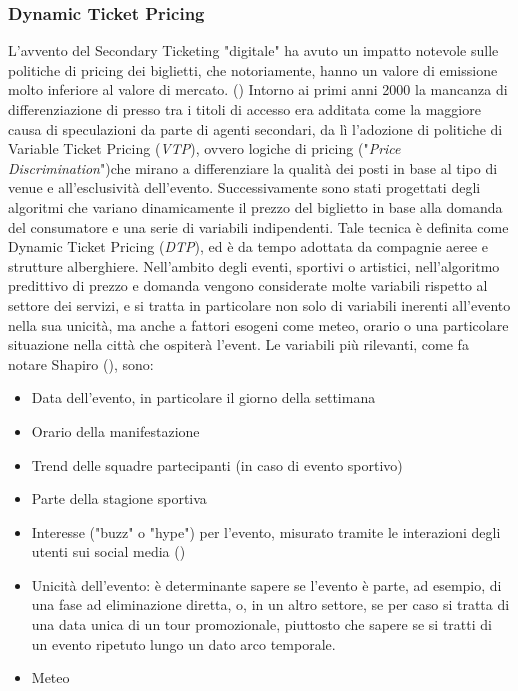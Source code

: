 \subsubsection{Dynamic Ticket Pricing} \label{dtp}
L'avvento del Secondary Ticketing "digitale" ha avuto un impatto notevole sulle politiche di pricing dei biglietti, che notoriamente, hanno un valore di emissione molto inferiore al valore di mercato. (\cite{courty2014pricing})
Intorno ai primi anni 2000 la mancanza di differenziazione di presso tra i titoli di accesso era additata come la maggiore causa di speculazioni da parte di agenti secondari, da lì l'adozione di politiche di Variable Ticket Pricing (\textit{VTP}), ovvero logiche di pricing ("\textit{Price Discrimination}")che mirano a differenziare la qualità dei posti in base al tipo di venue e all'esclusività dell'evento. 
Successivamente sono stati progettati degli algoritmi che variano dinamicamente il prezzo del biglietto in base alla domanda del consumatore e una serie di variabili indipendenti. Tale tecnica è definita come Dynamic Ticket Pricing (\textit{DTP}), ed è da tempo adottata da compagnie aeree e strutture alberghiere.
Nell'ambito degli eventi, sportivi o artistici, nell'algoritmo predittivo di prezzo e domanda vengono considerate molte variabili rispetto al settore dei servizi, e si tratta in particolare non solo di variabili inerenti all'evento nella sua unicità, ma anche a fattori esogeni come meteo, orario o una particolare situazione nella città che ospiterà l'event. 
Le variabili più rilevanti, come fa notare Shapiro (\cite{shapiro2014examination}), sono: 
\begin{itemize}
\item Data dell'evento, in particolare il giorno della settimana
\item Orario della manifestazione
\item Trend delle squadre partecipanti (in caso di evento sportivo)
\item Parte della stagione sportiva
\item Interesse ("buzz" o "hype") per l'evento, misurato tramite le interazioni degli utenti sui social media (\cite{o2018hashmoney})
\item Unicità dell'evento: è determinante sapere se l'evento è parte, ad esempio, di una fase ad eliminazione diretta, o, in un altro settore, se per caso si tratta di una data unica di un tour promozionale, piuttosto che sapere se si tratti di un evento ripetuto lungo un dato arco temporale. 
\item Meteo
\end{itemize}
